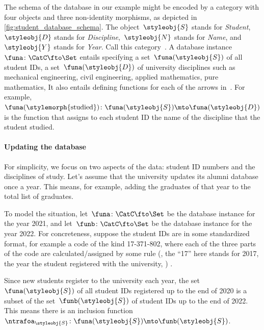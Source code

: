 %
\begin{marginfigure}
    \centering
    \caption{The schema of an alumni database.}
    \label{fig:student_database_schema}
\end{marginfigure}
%

The schema of the database in our example might be encoded by a category with four objects and three non-identity morphisms, as depicted in \cref{fig:student_database_schema}.
The object~$\styleobj{S}$ stands for \emph{Student},~$\styleobj{D}$ stands for \emph{Discipline},~$\styleobj{N}$ stands for \emph{Name}, and~$\styleobj{Y}$ stands for \emph{Year}.
Call this category~\CatC.
A database instance~$\funa \colon \CatC \fto \Set$ entails specifying a set~$\funa(\styleobj{S})$ of all student IDs, a set~$\funa(\styleobj{D})$ of university disciplines such as mechanical engineering, civil engineering, applied mathematics, pure mathematics, \etc
It also entails defining functions for each of the arrows in~\CatC.
For example,~$\funa(\stylemorph{\text{studied}}) \colon \funa(\styleobj{S}) \mto \funa(\styleobj{D})$ is the function that assigns to each student ID the name of the discipline that the student studied.

\paragraph{Updating the database}

For simplicity, we focus on two aspects of the data: student ID numbers and the disciplines of study.
Let's assume that the university updates its alumni database once a year.
This means, for example, adding the graduates of that year to the total list of graduates.

To model the situation, let~$\funa \colon \CatC \fto \Set$ be the database instance for the year 2021, and let~$\funb \colon \CatC \fto \Set$ be the database instance for the year 2022.
For concreteness, suppose the student IDs are in some standardized format, for example a code of the kind 17-371-802, where each of the three parts of the code are calculated/assigned by some rule (, the ``17'' here stands for 2017, the year the student registered with the university, \etc)
.

Since new students register to the university each year, the set~$\funa(\styleobj{S})$ of all student IDs registered up to the end of 2020 is a subset of the set~$\funb(\styleobj{S})$ of student IDs up to the end of 2022.
This means there is an inclusion function~$\ntrafoa_{\styleobj{S}} \colon \funa(\styleobj{S}) \mto \funb(\styleobj{S})$.

